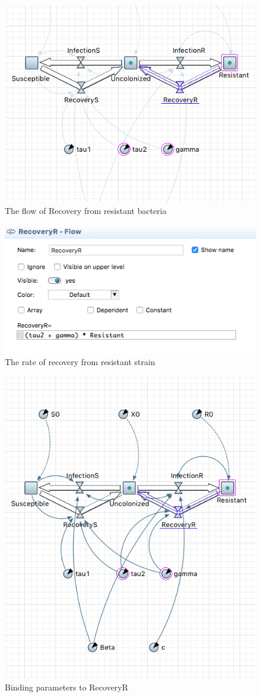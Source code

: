 \begin{figure}[H]
  \centering
  \includegraphics[height=0.5\textwidth]{img/screens/recovery/recovery8}
  \caption{The flow of Recovery from resistant bacteria}
\end{figure}

\begin{figure}[H]
  \centering
  \includegraphics[height=0.3\textwidth]{img/screens/recovery/recovery10}
  \caption{The rate of recovery from resistant strain}
\end{figure}

\begin{figure}[H]
  \centering
  \includegraphics[height=0.6\textwidth]{img/screens/recovery/recovery9}
  \caption{Binding parameters to RecoveryR}
\end{figure}

